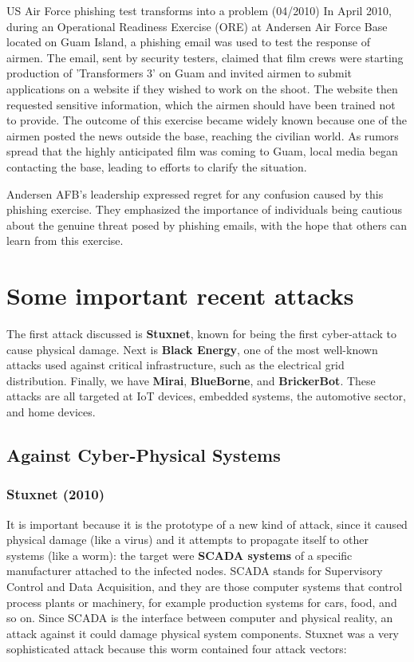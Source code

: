 \begin{casehistory}{US Air Force phishing test transforms into a problem (04/2010)}
  In April 2010, during an Operational Readiness Exercise (ORE) at Andersen Air Force Base located on Guam Island, a phishing email was used to test the response of airmen. The email, sent by security testers, claimed that film crews were starting production of 'Transformers 3' on Guam and invited airmen to submit applications on a website if they wished to work on the shoot. The website then requested sensitive information, which the airmen should have been trained not to provide. The outcome of this exercise became widely known because one of the airmen posted the news outside the base, reaching the civilian world. As rumors spread that the highly anticipated film was coming to Guam, local media began contacting the base, leading to efforts to clarify the situation.

  Andersen AFB's leadership expressed regret for any confusion caused by this phishing exercise. They emphasized the importance of individuals being cautious about the genuine threat posed by phishing emails, with the hope that others can learn from this exercise.
\end{casehistory}


\section{Some important recent attacks}
The first attack discussed is \textbf{Stuxnet}, known for being the first cyber-attack to cause physical damage. Next is \textbf{Black Energy}, one of the most well-known attacks used against critical infrastructure, such as the electrical grid distribution. Finally, we have \textbf{Mirai}, \textbf{BlueBorne}, and \textbf{BrickerBot}. These attacks are all targeted at IoT devices, embedded systems, the automotive sector, and home devices.

\subsection{Against Cyber-Physical Systems}

\subsubsection{Stuxnet (2010)}
It is important because it is the prototype of a new kind of attack, since it caused physical damage (like a virus) and it attempts to propagate itself to other systems (like a worm): the target were \textbf{SCADA systems} of a specific manufacturer attached to the infected nodes. SCADA stands for Supervisory Control and Data Acquisition, and they are those computer systems that control process plants or machinery, for example production systems for cars, food, and so on. Since SCADA is the interface between computer and physical reality, an attack against it could damage physical system components. Stuxnet was a very sophisticated attack because this worm contained four attack vectors:

